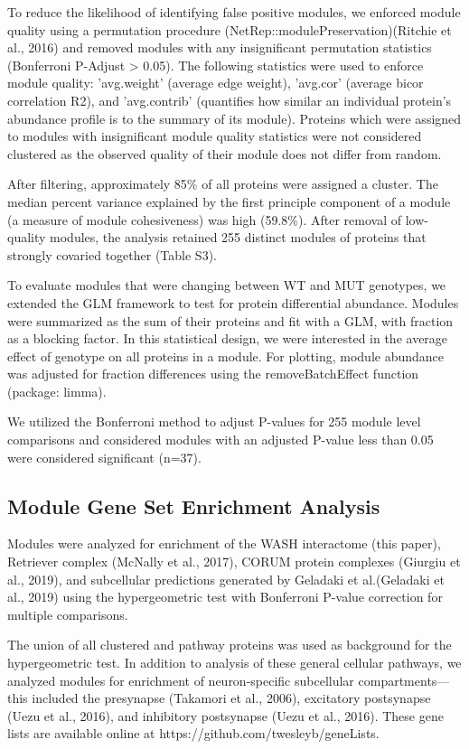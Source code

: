 To reduce the likelihood of identifying false positive modules, we enforced
module quality using a permutation procedure
(NetRep::modulePreservation)(Ritchie et al., 2016) and removed modules with any
insignificant permutation statistics (Bonferroni P-Adjust > 0.05). The following
statistics were used to enforce module quality: 'avg.weight' (average edge
weight), 'avg.cor' (average bicor correlation R2), and 'avg.contrib' (quantifies
how similar an individual protein's abundance profile is to the summary of its
module). Proteins which were assigned to modules with insignificant module
quality statistics were not considered clustered as the observed quality of
their module does not differ from random.

After filtering, approximately 85\%
of all proteins were assigned a cluster. The median percent variance explained
by the first principle component of a module (a measure of module cohesiveness)
was high (59.8\%). After removal of low-quality modules, the analysis retained
255 distinct modules of proteins that strongly covaried together (Table S3).

To evaluate modules that were changing between WT and MUT genotypes, we extended
the GLM framework to test for protein differential abundance. Modules were
summarized as the sum of their proteins and fit with a GLM, with fraction as a
blocking factor. In this statistical design, we were interested in the average
effect of genotype on all proteins in a module. For plotting, module abundance
was adjusted for fraction differences using the removeBatchEffect function
(package: limma).

We utilized the Bonferroni method to adjust P-values for 255 module level
comparisons and considered modules with an adjusted P-value less than 0.05 were
considered significant (n=37).

\subsection{Module Gene Set Enrichment Analysis}
Modules were analyzed for enrichment of the WASH interactome (this paper), Retriever complex (McNally et al., 2017), CORUM
protein complexes (Giurgiu et al., 2019), and subcellular predictions generated
by Geladaki et al.(Geladaki et al., 2019) using the hypergeometric test with
Bonferroni P-value correction for multiple comparisons.

The union of all
clustered and pathway proteins was used as background for the hypergeometric
test. In addition to analysis of these general cellular pathways, we analyzed
modules for enrichment of neuron-specific subcellular compartments—this included
the presynapse (Takamori et al., 2006), excitatory postsynapse (Uezu et al.,
2016), and inhibitory postsynapse (Uezu et al., 2016). These gene lists are
available online at https://github.com/twesleyb/geneLists.

